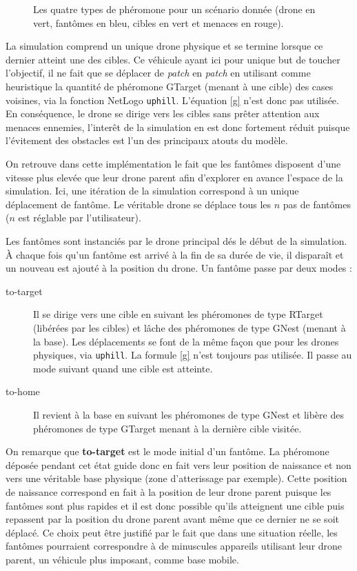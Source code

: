\documentclass[12pt]{article}
\begin{document}
\begin{figure}[p]
  \caption{Les quatre types de phéromone pour un scénario donnée
    (drone en vert, fantômes en bleu, cibles en vert et menaces en
    rouge).}
  \label{pheromones}
\end{figure}

La simulation comprend un unique drone physique et se termine lorsque
ce dernier atteint une des cibles. Ce véhicule ayant ici pour unique
but de toucher l'objectif, il ne fait que se déplacer de
\textit{patch} en \textit{patch} en utilisant comme heuristique la
quantité de phéromone GTarget (menant à une cible) des cases voisines,
via la fonction NetLogo \texttt{uphill}. L'équation \ref{g} n'est donc
pas utilisée. En conséquence, le drone se dirige vers les cibles sans
prêter attention aux menaces ennemies, l'interêt de la simulation en
est donc fortement réduit puisque l'évitement des obstacles est l'un
des principaux atouts du modèle.

On retrouve dans cette implémentation le fait que les fantômes
disposent d'une vitesse plus elevée que leur drone parent afin
d'explorer en avance l'espace de la simulation. Ici, une itération de
la simulation correspond à un unique déplacement de fantôme. Le
véritable drone se déplace tous les $n$ pas de fantômes ($n$ est
réglable par l'utilisateur).

Les fantômes sont instanciés par le drone principal dés le début de la
simulation. \`A chaque fois qu'un fantôme est arrivé à la fin de sa
durée de vie, il disparaît et un nouveau est ajouté à la position du
drone. Un fantôme passe par deux modes :

\begin{description}

  \item[to-target]{Il se dirige vers une cible en suivant les
    phéromones de type RTarget (libérées par les cibles) et lâche des
    phéromones de type GNest (menant à la base). Les déplacements se
    font de la même façon que pour les drones physiques, via
    \texttt{uphill}. La formule \ref{g} n'est toujours pas
    utilisée. Il passe au mode suivant quand une cible est atteinte.}

  \item[to-home]{Il revient à la base en suivant les phéromones de
    type GNest et libère des phéromones de type GTarget menant à la
    dernière cible visitée.}

\end{description}

On remarque que \textbf{to-target} est le mode initial d'un
fantôme. La phéromone déposée pendant cet état guide donc en fait vers
leur position de naissance et non vers une véritable base physique
(zone d'atterissage par exemple). Cette position de naissance
correspond en fait à la position de leur drone parent puisque les
fantômes sont plus rapides et il est donc possible qu'ils atteignent
une cible puis repassent par la position du drone parent avant même
que ce dernier ne se soit déplacé. Ce choix peut être justifié par le
fait que dans une situation réelle, les fantômes pourraient
correspondre à de minuscules appareils utilisant leur drone parent, un
véhicule plus imposant, comme base mobile.
\end{document}
